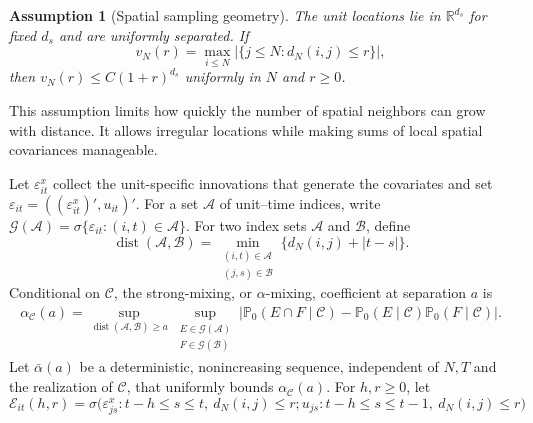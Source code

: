 \documentclass[11pt]{article}
\numberwithin{equation}{section}
\newtheorem{assumption}{Assumption}
\theoremstyle{remark}
\newcommand{\R}{\mathbb R}
\newcommand{\Pzero}{\mathbb P_0}
\begin{document}
\begin{assumption}[Spatial sampling geometry]
\label{a:geometry}
The unit locations lie in $\R^{d_s}$ for fixed $d_s$ and are uniformly separated. If
$$
v_N(r)
=
\max_{i\le N}
\left|\{j\le N:d_N(i,j)\le r\}\right|,
$$
then $v_N(r)\le C(1+r)^{d_s}$ uniformly in $N$ and $r\ge0$.
\end{assumption}
This assumption limits how quickly the number of spatial neighbors can grow with distance. It allows irregular locations while making sums of local spatial covariances manageable.

Let $\varepsilon_{it}^x$ collect the unit-specific innovations that generate the covariates and set $\varepsilon_{it}=((\varepsilon_{it}^x)',u_{it})'$. For a set $\mathcal A$ of unit--time indices, write
$
\mathscr G(\mathcal A)
=
\sigma\{\varepsilon_{it}:(i,t)\in\mathcal A\}.
$
For two index sets $\mathcal A$ and $\mathcal B$, define
$$
\operatorname{dist}(\mathcal A,\mathcal B)
=
\min_{\substack{(i,t)\in\mathcal A\\(j,s)\in\mathcal B}}
\{d_N(i,j)+|t-s|\}.
$$
Conditional on $\mathscr C$, the strong-mixing, or $\alpha$-mixing, coefficient at separation $a$ is
$$
\begin{aligned}
\alpha_{\mathscr C}(a)
=
\sup_{\operatorname{dist}(\mathcal A,\mathcal B)\ge a}
\sup_{\substack{E\in\mathscr G(\mathcal A)\\F\in\mathscr G(\mathcal B)}}
\big|
\Pzero(E\cap F\mid\mathscr C)
-\Pzero(E\mid\mathscr C)\Pzero(F\mid\mathscr C)
\big|.
\end{aligned}
$$
Let $\bar\alpha(a)$ be a deterministic, nonincreasing sequence, independent of $N,T$ and the realization of $\mathscr C$, that uniformly bounds $\alpha_{\mathscr C}(a)$. For $h,r\ge0$, let
$$
\mathscr E_{it}(h,r)
=
\sigma\Big(
\varepsilon^x_{js}:
t-h\le s\le t,\ d_N(i,j)\le r;
u_{js}:
t-h\le s\le t-1,\ d_N(i,j)\le r
\Big)
$$
\end{document}
